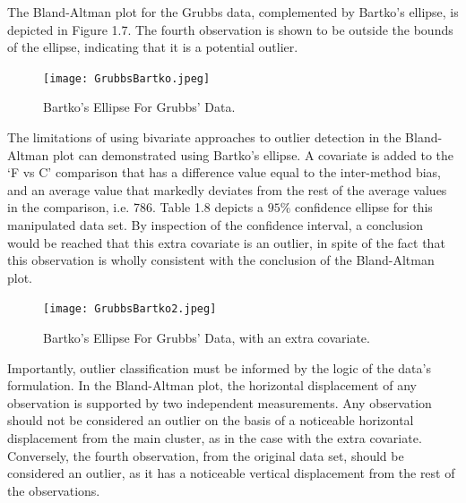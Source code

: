 \documentclass[12pt, a4paper]{report}
\theoremstyle{plain}
\theoremstyle{definition}
\theoremstyle{remark}
\begin{document}

The Bland-Altman plot for the Grubbs data, complemented by Bartko's ellipse, is depicted in Figure 1.7.
The fourth observation is shown to be outside the bounds of the ellipse, indicating that it is a potential outlier.


\begin{figure}[h!]
  \texttt{[image: GrubbsBartko.jpeg]}
  \caption{Bartko's Ellipse For Grubbs' Data.}\label{GrubbsBartko}
\end{figure}

The limitations of using bivariate approaches to outlier detection
in the Bland-Altman plot can demonstrated using Bartko's ellipse.
A covariate is added to the `F vs C' comparison that has a
difference value equal to the inter-method bias, and an average
value that markedly deviates from the rest of the average values
in the comparison, i.e. 786. Table 1.8 depicts a $95\%$ confidence
ellipse for this manipulated data set. By inspection of the
confidence interval, a conclusion would be reached that this extra
covariate is an outlier, in spite of the fact that this
observation is wholly consistent with the conclusion of the
Bland-Altman plot.

\begin{figure}[h!]
  \texttt{[image: GrubbsBartko2.jpeg]}
  \caption{Bartko's Ellipse For Grubbs' Data, with an extra covariate.}\label{GrubbsBartko2}
\end{figure}


Importantly, outlier classification must be informed by the logic of the
data's formulation. In the Bland-Altman plot, the horizontal displacement of any
observation is supported by two independent measurements. Any
observation should not be considered an outlier on the basis of a
noticeable horizontal displacement from the main cluster, as in
the case with the extra covariate. Conversely, the fourth
observation, from the original data set, should be considered an
outlier, as it has a noticeable vertical displacement from the
rest of the observations.


\end{document}
